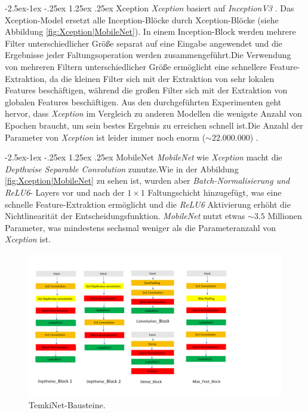 \documentclass[12pt,a4paper]{scrartcl}
\makeatletter
\numberwithin{equation}{section}
\renewcommand\paragraph{\@startsection{paragraph}{4}{\z@}%
	{-2.5ex\@plus -1ex \@minus -.25ex}%
	{1.25ex \@plus .25ex}%
	{\normalfont\normalsize\bfseries}}
\makeatother
\begin{document}
\paragraph{Xception}\label{Xception}
\textit{Xception} \cite{Xception} basiert auf  \textit{InceptionV3} \cite{InceptionV3}. 
Das Xception-Model ersetzt alle Inception-Blöcke durch Xception-Blöcke (siehe Abbildung \ref{fig:Xception|MobileNet}). In einem Inception-Block werden mehrere Filter unterschiedlicher Größe separat auf eine Eingabe angewendet und die Ergebnisse jeder Faltungsoperation werden zusammengeführt.Die Verwendung von mehreren Filtern unterschiedlicher Größe ermöglicht eine schnellere Feature-Extraktion, da die kleinen Filter sich mit der Extraktion von sehr lokalen Features beschäftigen, während die großen Filter sich mit der Extraktion von globalen Features beschäftigen. Aus den durchgeführten Experimenten geht hervor, dass \textit{Xception} im Vergleich zu anderen Modellen die wenigste Anzahl von Epochen braucht, um sein bestes Ergebnis zu erreichen schnell ist.Die Anzahl der Parameter von \textit{Xception} ist leider immer noch enorm ($ \sim22.000.000 $) .

\paragraph{MobileNet}
\textit{MobileNet} \cite{MobileNet} wie \textit{Xception} macht die \textit{Depthwise Separable Convolution} zunutze.Wie in der Abbildung \ref{fig:Xception|MobileNet} zu sehen ist, wurden aber \textit{Batch-Normalisierung und ReLU6}- Layers vor und nach der $ 1\times1 $ Faltungschicht hinzugefügt, was eine schnelle Feature-Extraktion ermöglicht und die \textit{ReLU6} Aktivierung erhöht die Nichtlinearität der Entscheidungsfunktion. \textit{MobileNet} nutzt etwas $\sim 3.5$ Millionen Parameter, was mindestens sechsmal weniger als die Parameteranzahl von \textit{Xception} ist.

\begin{figure}[h!]
\centering
\includegraphics[width=\textwidth ]{Convolution/Folie4}
\caption{TemkiNet-Bausteine.}
\label{fig:TEMKENG_NET}
\end{figure}
\end{document}
